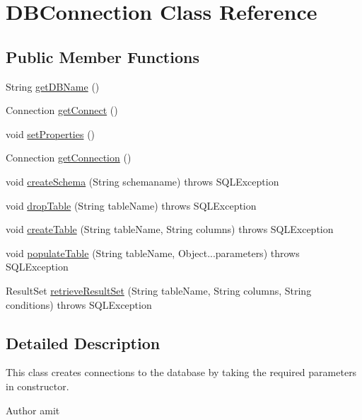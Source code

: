 \hypertarget{class_d_b_connection}{\section{D\-B\-Connection Class Reference}
\label{class_d_b_connection}
}
\subsection*{Public Member Functions}
\begin{DoxyCompactItemize}
\item 
String \hyperlink{class_d_b_connection_a5db915c711a7fe87b76839db531b045a}{get\-D\-B\-Name} ()
\item 
Connection \hyperlink{class_d_b_connection_ad931f04e763064e0783ac6b812e71380}{get\-Connect} ()
\item 
void \hyperlink{class_d_b_connection_ac3c0a6e8676f9b4e4197088c3a2cee2b}{set\-Properties} ()
\item 
Connection \hyperlink{class_d_b_connection_abf660ee4c1d0c01371b9aaebb95bffda}{get\-Connection} ()
\item 
void \hyperlink{class_d_b_connection_a9ff0b2dbf7570e376582d966c631aefb}{create\-Schema} (String schemaname)  throws S\-Q\-L\-Exception
\item 
void \hyperlink{class_d_b_connection_a04648cfe383fc86dab0b7c89040cc2a3}{drop\-Table} (String table\-Name)  throws S\-Q\-L\-Exception
\item 
void \hyperlink{class_d_b_connection_a52ec5e8f563ccab29045a874d5727ac6}{create\-Table} (String table\-Name, String columns)  throws S\-Q\-L\-Exception 
\item 
void \hyperlink{class_d_b_connection_a7df51ca3564584b74dd970c1b0fa06fe}{populate\-Table} (String table\-Name, Object...\-parameters)  throws S\-Q\-L\-Exception 
\item 
Result\-Set \hyperlink{class_d_b_connection_ae45cfcbf6f06447c03a32fddb75f3b4e}{retrieve\-Result\-Set} (String table\-Name, String columns, String conditions)  throws S\-Q\-L\-Exception 
\end{DoxyCompactItemize}


\subsection{Detailed Description}
This class creates connections to the database by taking the required parameters in constructor. \begin{DoxyAuthor}{Author}
amit 
\end{DoxyAuthor}


